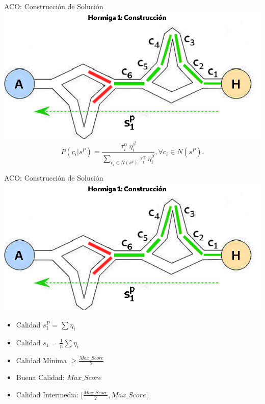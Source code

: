 \begin{frame}{ACO: Construcci\'on de Soluci\'on}
\centering
\includegraphics[scale=0.35]{Pictures/ACO-ant-Constr-choices.png}
        \begin{equation}
P(c_{i} | s^{P}) = \frac
        {\tau_{i}^{\alpha} ~ \eta_{i}^{\beta}}
        {\sum\limits_{c_{i}\in N(s^p)}{\tau_{i}^{\alpha} ~ \eta_{i}^{\beta} } }, \forall c_{i} \in N(s^{P}).
\label{eq:antProbabilities}
\end{equation}
\end{frame}

\begin{frame}{ACO: Construcci\'on de Soluci\'on}
\centering
\includegraphics[scale=0.35]{Pictures/ACO-ant-Constr-choices.png}
\begin{itemize}
    \item Calidad $s^{P}_1$ = $\sum \eta_{i}$
    \item Calidad $s_1$ = $\frac{1}{n}\sum \eta_{i} $
    \item Calidad M\'inima $\geq \frac{Max\_Score}{2}$
    \item Buena Calidad: $Max\_Score$
    \item Calidad Intermedia: $[\frac{Max\_Score}{2}, Max\_Score[$
\end{itemize}
\end{frame}


